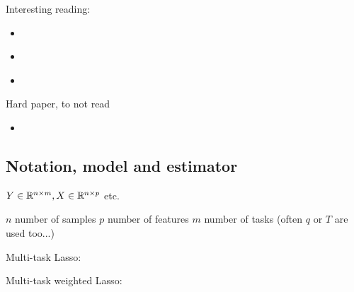 Interesting reading:
\begin{itemize}
    \item \citet{Candes_Wakin_Boyd08}
    \item \citet{Arlot_Celisse10}
    \item \citet{Pedregosa16}
\end{itemize}
%
Hard paper, to not read
\begin{itemize}
    \item \citet{Deledalle_Vaiter_Fadili_Peyre14}
\end{itemize}


\subsection{Notation, model and estimator}
\label{sub:model}

$Y\in \mathbb{R}^{n\times m}, X\in \mathbb{R}^{n\times p}$ etc.

$n$ number of samples
$p$ number of features
$m$ number of tasks (often $q$ or $T$ are used too...)



Multi-task Lasso:


Multi-task weighted Lasso:
